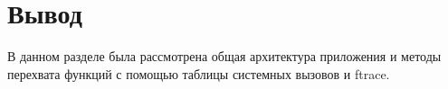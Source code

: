 
\section{Вывод}
    В данном разделе была рассмотрена общая архитектура приложения и
    методы перехвата функций с помощью таблицы системных вызовов и ftrace.

\pagebreak